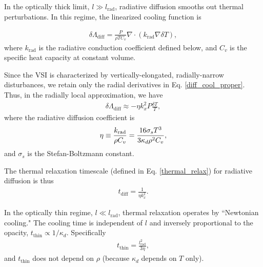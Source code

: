 In the optically thick limit, $l\gg l_\mathrm{rad}$, radiative diffusion smooths out thermal perturbations.
In this regime, the linearized cooling function is

\begin{align}\label{diff_cool_proper}
  \delta \Lambda_\mathrm{diff} = \frac{P}{\rho T C_v} \nabla\cdot\left(k_\mathrm{rad}\nabla\delta
    T\right),  
\end{align}
where $k_\mathrm{rad}$ is the radiative conduction coefficient defined
below, and $C_v$ is the specific heat capacity at constant volume. 

Since the VSI is characterized by vertically-elongated,
radially-narrow disturbances, we retain only the radial derivatives in Eq. \ref{diff_cool_proper}.
Thus, in the radially local approximation, we have
\begin{align}\label{diff_cool_approx}
  \delta\Lambda_\mathrm{diff} \approx %
  -\eta k_x^2 P \frac{\delta T}{T}, %
\end{align}
where the radiative diffusion coefficient is
\begin{align}\label{eta_def}
  \eta \equiv {k_\mathrm{rad} \over \rho C_v} = \frac{16\sigma_s T^3}{3\kappa_d\rho^2 C_v}, 
\end{align}
and $\sigma_s$ is the Stefan-Boltzmann constant. 

The thermal relaxation  timescale (defined in Eq. \ref{thermal_relax}) 
for radiative diffusion is thus 
\begin{align}\label{tc_diff_cool} 
  t_\mathrm{diff} = \frac{1}{\eta k_x^2}.%
\end{align}

In the optically thin regime, $l\ll 
l_\mathrm{rad}$, thermal relaxation operates by ``Newtonian cooling."
The cooling time is independent of $l$ and 
inversely proportional to the opacity, $t_\mathrm{thin} \propto 1/\kappa_d$. 
Specifically 
\begin{align}
  t_\mathrm{thin} = \frac{l_\mathrm{rad}^2}{3\eta},
\end{align}
and $t_\mathrm{thin}$ does not depend on $\rho$ (because $\kappa_d$ depends on $T$ only). 

